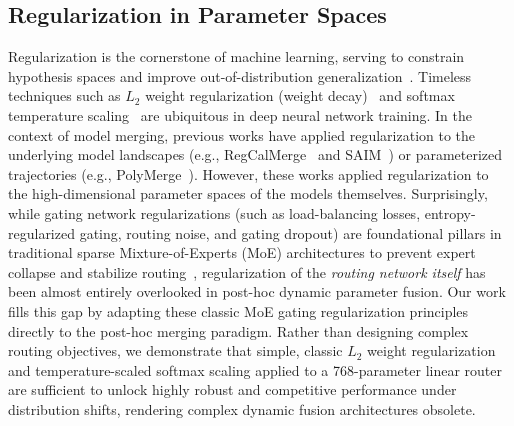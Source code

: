 \subsection{Regularization in Parameter Spaces}
Regularization is the cornerstone of machine learning, serving to constrain hypothesis spaces and improve out-of-distribution generalization~\cite{goodfellow2016deep, shwartz2014understanding}. Timeless techniques such as $L_2$ weight regularization (weight decay)~\cite{Loshchilov2019} and softmax temperature scaling~\cite{srivastava2014dropout} are ubiquitous in deep neural network training. In the context of model merging, previous works have applied regularization to the underlying model landscapes (e.g., RegCalMerge~\cite{RegCalMerge2024} and SAIM~\cite{saim}) or parameterized trajectories (e.g., PolyMerge~\cite{PolyMerge2025}). However, these works applied regularization to the high-dimensional parameter spaces of the models themselves. Surprisingly, while gating network regularizations (such as load-balancing losses, entropy-regularized gating, routing noise, and gating dropout) are foundational pillars in traditional sparse Mixture-of-Experts (MoE) architectures to prevent expert collapse and stabilize routing~\cite{shazeer2017outrageously, fedus2022switch}, regularization of the \emph{routing network itself} has been almost entirely overlooked in post-hoc dynamic parameter fusion. Our work fills this gap by adapting these classic MoE gating regularization principles directly to the post-hoc merging paradigm. Rather than designing complex routing objectives, we demonstrate that simple, classic $L_2$ weight regularization and temperature-scaled softmax scaling applied to a 768-parameter linear router are sufficient to unlock highly robust and competitive performance under distribution shifts, rendering complex dynamic fusion architectures obsolete.
